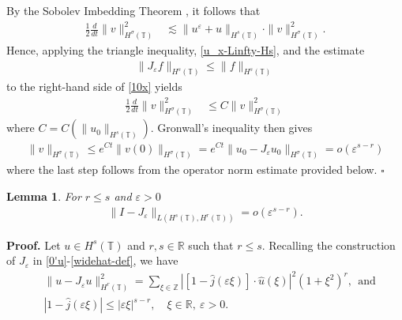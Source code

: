 \documentclass[12pt,reqno]{amsart}
\renewcommand{\qedsymbol}{\ensuremath{\square}}
\newcommand{\rr}{\mathbb{R}}
\newcommand{\zz}{\mathbb{Z}}
\newcommand{\ci}{\mathbb{T}}
\newcommand{\ee}{\varepsilon}
\theoremstyle{plain}  %
\newtheorem{lemma}{Lemma}
\theoremstyle{definition}
\begin{document}
%
%
By the Sobolev Imbedding Theorem , it follows that 
%
%
\begin{equation}
\begin{split}
\frac{1}{2}\frac{d}{dt} \|v\|_{H^{\sigma}(\ci)}^2
& \lesssim
\|u^{\ee}
+ u\|_{H^{s}(\ci)} \cdot \|v\|_{H^{\sigma}(\ci)}^2.
\label{10x}
\end{split}
\end{equation}
%
%
Hence, applying the triangle inequality, \eqref{u_x-Linfty-Hs}, and the estimate
%
%
\begin{equation}
\begin{split}
	\|J_\ee f\|_{H^s(\ci)} \le \|f\|_{H^s(\ci)}
\label{lem100u}
\end{split}
\end{equation}
%
%
%
%
to the right-hand side of \eqref{10x} yields
%
%
%
%
%
\begin{equation*}
\begin{split}
\label{12x}
\frac{1}{2}\frac{d}{dt} \|v\|_{H^{\sigma}(\ci)}^2
& \le
C \|v\|_{H^{\sigma}(\ci)}^2
\end{split}
\end{equation*}
%
%
where $C = C(\|u_0\|_{H^s(\ci)})$. Gronwall's inequality then gives
%
%
%
\begin{equation*}
\label{conc-lemma}
\begin{split}
\|v\|_{H^{\sigma}(\ci)}
 \le e^{C t}\|v(0)\|_{H^{\sigma}(\ci)}
 = e^{C t}\|u_0 - J_\ee u_0 \|_{H^{\sigma}(\ci)} = o(\ee^{s-r})
\end{split}
\end{equation*}
%
%
%
%
%
where the last step follows from the operator norm estimate provided below. 
\qquad \qedsymbol
%
%
\begin{lemma}
\label{lem4r}
For $r \le s$ and $\ee>0$
%
%
\begin{equation}
\label{0r}
\begin{split}
\|I - J_\ee\|_{L(H^s(\ci), H^r(\ci))} = o(\ee^{s-r}).
\end{split}
\end{equation}
%
%
\end{lemma}
%
%
{\bf Proof.}
Let $u \in H^s(\ci)$ and $r, s \in \rr$ such that $r \le s$. 
Recalling the construction of $J_\ee$ in
\eqref{0'u}-\eqref{widehat-def}, we have
%
%
\begin{align}
\label{1r}
& \|u - J_\ee u\|_{H^r(\ci)}^2 = \sum_{\xi \in \zz} | [1- \widehat{j}(\ee 
\xi)] \cdot \widehat{u}(\xi) |^2
(1+\xi^2)^r, \ \ \text{and}
\\
& |1 - \widehat{ j }(\ee \xi)| \le |\ee \xi |^{s-r}, \quad 
\xi \in \rr, \ \ee > 0.
\label{2r}
\end{align}
\end{document}
